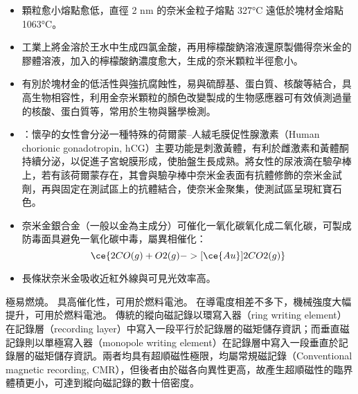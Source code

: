 \documentclass[a4paper,12pt]{report}
\begin{document}
\begin{itemize}
\begin{itemize}
\begin{itemize}
\item 顆粒愈小熔點愈低，直徑 2 nm 的奈米金粒子熔點 327°C 遠低於塊材金熔點 1063°C。
\item 工業上將金溶於王水中生成四氯金酸，再用檸檬酸鈉溶液還原製備得奈米金的膠體溶液，加入的檸檬酸鈉濃度愈大，生成的奈米顆粒半徑愈小。
\item 有別於塊材金的低活性與強抗腐蝕性，易與硫醇基、蛋白質、核酸等結合，具高生物相容性，利用金奈米顆粒的顏色改變製成的生物感應器可有效偵測過量的核酸、蛋白質等，常用於生物與醫學檢測。
\item {}：懷孕的女性會分泌一種特殊的荷爾蒙–人絨毛膜促性腺激素（Human chorionic gonadotropin, hCG）主要功能是刺激黃體，有利於雌激素和黃體酮持續分泌，以促進子宮蛻膜形成，使胎盤生長成熟。將女性的尿液滴在驗孕棒上，若有該荷爾蒙存在，其會與驗孕棒中奈米金表面有抗體修飾的奈米金試劑，再與固定在測試區上的抗體結合，使奈米金聚集，使測試區呈現紅寶石色。
\item 奈米金銀合金（一般以金為主成分）可催化一氧化碳氧化成二氧化碳，可製成防毒面具避免一氧化碳中毒，屬異相催化：
\[\ce{2CO(g) + O2(g) -> [\ce{Au}] 2CO2(g)}\]
\item 長條狀奈米金吸收近紅外線與可見光效率高。
\end{itemize}
極易燃燒。
具高催化性，可用於燃料電池。
在導電度相差不多下，機械強度大幅提升，可用於燃料電池。
\bct\bfH\ctr{}\ef\FB\ect
傳統的縱向磁記錄以環寫入器（ring writing element）在記錄層（recording layer）中寫入一段平行於記錄層的磁矩儲存資訊；而垂直磁記錄則以單極寫入器（monopole writing element）在記錄層中寫入一段垂直於記錄層的磁矩儲存資訊。兩者均具有超順磁性極限，均屬常規磁記錄（Conventional magnetic recording, CMR），但後者由於磁各向異性更高，故產生超順磁性的臨界體積更小，可達到縱向磁記錄的數十倍密度。


\end{itemize}
\end{itemize}
\end{document}
